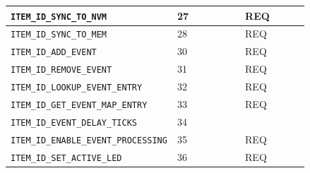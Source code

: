 {\begin{longtable}{@{}|p{0.4\linewidth}|p{0.06\linewidth}|p{0.08\linewidth}|p{0.08\linewidth}|p{0.22\linewidth}|@{}}
    \texttt{ITEM\_ID\_SYNC\_TO\_NVM}     & 27  & & & REQ \\
    \midrule

    \texttt{ITEM\_ID\_SYNC\_TO\_MEM}     & 28  & & & REQ \\
    \midrule

    \texttt{ITEM\_ID\_ADD\_EVENT}        & 30  & & & REQ \\
    \midrule

    \texttt{ITEM\_ID\_REMOVE\_EVENT}     & 31  & & & REQ \\
    \midrule

    \texttt{ITEM\_ID\_LOOKUP\_EVENT\_ENTRY} & 32 & & & REQ \\
    \midrule

    \texttt{ITEM\_ID\_GET\_EVENT\_MAP\_ENTRY} & 33 & & & REQ \\
    \midrule

    \texttt{ITEM\_ID\_EVENT\_DELAY\_TICKS} & 34 & & & \\
    \midrule

    \texttt{ITEM\_ID\_ENABLE\_EVENT\_PROCESSING} & 35 & & & REQ \\
    \midrule

    \texttt{ITEM\_ID\_SET\_ACTIVE\_LED}  & 36  & & & REQ \\
    \midrule

\end{longtable}

}